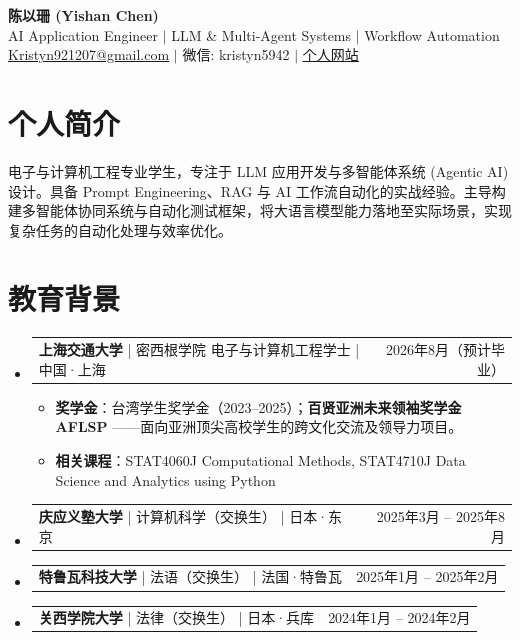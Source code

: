 \documentclass[UTF8,a4paper,10pt]{ctexart}
\makeatletter
\newcommand{\resumeItem}[1]{\item\small{\linespread{1.1}\selectfont #1\par}\vspace{-0.5pt}}
\newcommand{\resumeProjectHeading}[2]{%
  \item
  \begin{tabular*}{0.97\textwidth}{l@{\extracolsep{\fill}}r}
    \normalsize #1 & #2 \\
  \end{tabular*}\vspace{-4pt}
}
\newcommand{\resumeSubHeadingListStart}{\begin{itemize}[label={}, leftmargin=0.15in]}
\newcommand{\resumeSubHeadingListEnd}{\end{itemize}}
\newcommand{\resumeItemListStart}{\begin{itemize}[label=\tiny$\bullet$, itemsep=0pt, topsep=3pt, parsep=0pt]}
\newcommand{\resumeItemListEnd}{\end{itemize}\vspace{-6pt}}
\makeatother
\begin{document}
\begin{center}
  \textbf{\large \heiti 陈以珊 (Yishan Chen)} \\ \vspace{1pt}
  \small AI Application Engineer $|$ LLM \& Multi-Agent Systems $|$ Workflow Automation \\ \vspace{1pt}
  \small \href{mailto:Kristyn921207@gmail.com}{Kristyn921207@gmail.com} $|$ 微信: kristyn5942 $|$ \href{https://kristynchen.github.io/Personal-Website/}{\underline{个人网站}}
\end{center}
\vspace{-12pt}

\section{个人简介}
\small {电子与计算机工程专业学生，专注于 LLM 应用开发与多智能体系统 (Agentic AI) 设计。具备 Prompt Engineering、RAG 与 AI 工作流自动化的实战经验。主导构建多智能体协同系统与自动化测试框架，将大语言模型能力落地至实际场景，实现复杂任务的自动化处理与效率优化。}
\vspace{-4pt}

\section{教育背景}
\resumeSubHeadingListStart
  \resumeProjectHeading
    {\textbf{上海交通大学} \quad \quad | \quad 密西根学院 电子与计算机工程学士 \quad | \quad 中国·上海 }{2026年8月（预计毕业）}
    \resumeItemListStart
      \resumeItem{\textbf{奖学金}：台湾学生奖学金（2023--2025）；\textbf{百贤亚洲未来领袖奖学金 AFLSP }——面向亚洲顶尖高校学生的跨文化交流及领导力项目。}
      \resumeItem{\textbf{相关课程}：STAT4060J Computational Methods, STAT4710J Data Science and Analytics using Python}
    \resumeItemListEnd

  \resumeProjectHeading
    {\textbf{庆应义塾大学} \quad \quad | \quad 计算机科学（交换生） \quad | \quad 日本·东京}{2025年3月 -- 2025年8月}
  \resumeProjectHeading
    {\textbf{特鲁瓦科技大学} \quad | \quad 法语（交换生） \quad | \quad 法国·特鲁瓦}{2025年1月 -- 2025年2月}
  \resumeProjectHeading
    {\textbf{关西学院大学} \quad \quad | \quad 法律（交换生） \quad | \quad 日本·兵库}{2024年1月 -- 2024年2月}
\resumeSubHeadingListEnd

\end{document}
